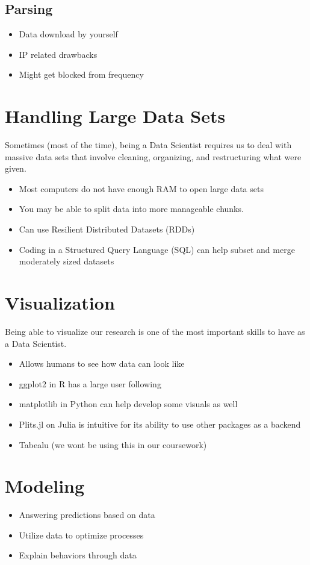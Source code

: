 \documentclass{article}
\begin{document}
\subsection{Parsing}
\begin{itemize}
    \item  Data download by yourself
    \item IP related drawbacks
    \item Might get blocked from frequency
\end{itemize}

\section{Handling Large Data Sets}
    Sometimes (most of the time),  being a Data Scientist requires us to deal with massive data sets that involve cleaning, organizing, and restructuring what were given. 
    \begin{itemize}
        \item Most computers do not have enough RAM to open large data sets
        \item You may be able to split data into more manageable chunks. 
        \item Can use Resilient Distributed Datasets (RDDs)
        \item Coding in a Structured Query Language (SQL) can help subset and merge moderately sized datasets
    \end{itemize}

\section{Visualization}
Being able to visualize our research is one of the most important skills to have as a Data Scientist.
\begin{itemize}
    \item Allows humans to see how data can look like
    \item ggplot2 in R has a large user following
    \item matplotlib in Python can help develop some visuals as well
    \item Plits.jl on Julia is intuitive for its ability to use other packages as a backend
    \item Tabealu (we wont be using this in our coursework)

\end{itemize}
    
\section{Modeling}

\begin{itemize}

    \item Answering predictions based on data
    \item Utilize data to optimize processes
    \item Explain behaviors through data
    
\end{itemize}
\end{document}
